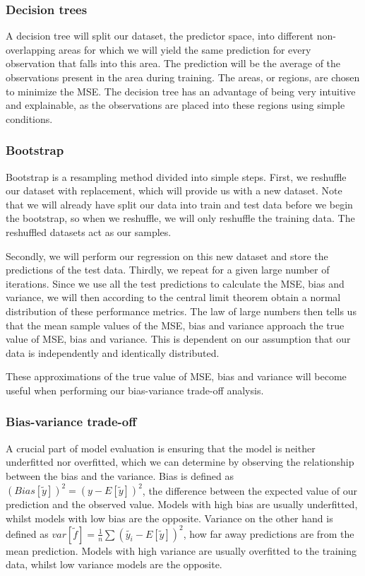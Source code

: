 \documentclass[onecolumn,10pt,cleanfoot]{asme2ej}
\begin{document}
\subsubsection{Decision trees}
A decision tree will split our dataset, the predictor space, into different non-overlapping areas for which we will yield the same prediction for every observation that falls into this area. The prediction will be the average of the observations present in the area during training. The areas, or regions, are chosen to minimize the MSE. The decision tree has an advantage of being very intuitive and explainable, as the observations are placed into these regions using simple conditions.

\subsubsection{Bootstrap}

Bootstrap is a resampling method divided into simple steps. First, we reshuffle our dataset with replacement, which will provide us with a new dataset. Note that we will already have split our data into train and test data before we begin the bootstrap, so when we reshuffle, we will only reshuffle the training data. The reshuffled datasets act as our samples.

Secondly, we will perform our regression on this new dataset and store the predictions of the test data. Thirdly, we repeat for a given large number of iterations. Since we use all the test predictions to calculate the MSE, bias and variance, we will then according to the central limit theorem \cite{CLT} obtain a normal distribution of these performance metrics. The law of large numbers \cite{LLN} then tells us that the mean sample values of the MSE, bias and variance approach the true value of MSE, bias and variance. This is dependent on our assumption that our data is independently and identically distributed.

These approximations of the true value of MSE, bias and variance will become useful when performing our bias-variance trade-off analysis.

\subsubsection{Bias-variance trade-off}

A crucial part of model evaluation is ensuring that the model is neither underfitted nor overfitted, which we can determine by observing the relationship between the bias and the variance. Bias is defined as $(Bias[\tilde{y}])^2 = (y-E[\tilde{y}])^2$, the difference between the expected value of our prediction and the observed value. Models with high bias are usually underfitted, whilst models with low bias are the opposite. Variance on the other hand is defined as $var[\tilde{f}] = \frac{1}{n}\sum(\tilde{y_i}-E[\tilde{y}])^2$, how far away predictions are from the mean prediction. Models with high variance are usually overfitted to the training data, whilst low variance models are the opposite.
\end{document}
